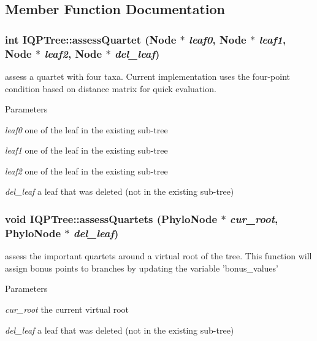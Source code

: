 \subsection{Member Function Documentation}
\hypertarget{classIQPTree_ac33ea4963fb4d0ae1ba3e9df424aa7bc}{
\subsubsection[{assessQuartet}]{\setlength{\rightskip}{0pt plus 5cm}int IQPTree::assessQuartet ({\bf Node} $\ast$ {\em leaf0}, \/  {\bf Node} $\ast$ {\em leaf1}, \/  {\bf Node} $\ast$ {\em leaf2}, \/  {\bf Node} $\ast$ {\em del\_\-leaf})}}
\label{classIQPTree_ac33ea4963fb4d0ae1ba3e9df424aa7bc}
assess a quartet with four taxa. Current implementation uses the four-\/point condition based on distance matrix for quick evaluation. 
\begin{DoxyParams}{Parameters}
\item[{\em leaf0}]one of the leaf in the existing sub-\/tree \item[{\em leaf1}]one of the leaf in the existing sub-\/tree \item[{\em leaf2}]one of the leaf in the existing sub-\/tree \item[{\em del\_\-leaf}]a leaf that was deleted (not in the existing sub-\/tree) \end{DoxyParams}
\hypertarget{classIQPTree_a5d319c525a15c21f9956fcae5e9d0884}{
\subsubsection[{assessQuartets}]{\setlength{\rightskip}{0pt plus 5cm}void IQPTree::assessQuartets ({\bf PhyloNode} $\ast$ {\em cur\_\-root}, \/  {\bf PhyloNode} $\ast$ {\em del\_\-leaf})}}
\label{classIQPTree_a5d319c525a15c21f9956fcae5e9d0884}
assess the important quartets around a virtual root of the tree. This function will assign bonus points to branches by updating the variable 'bonus\_\-values' 
\begin{DoxyParams}{Parameters}
\item[{\em cur\_\-root}]the current virtual root \item[{\em del\_\-leaf}]a leaf that was deleted (not in the existing sub-\/tree) \end{DoxyParams}
